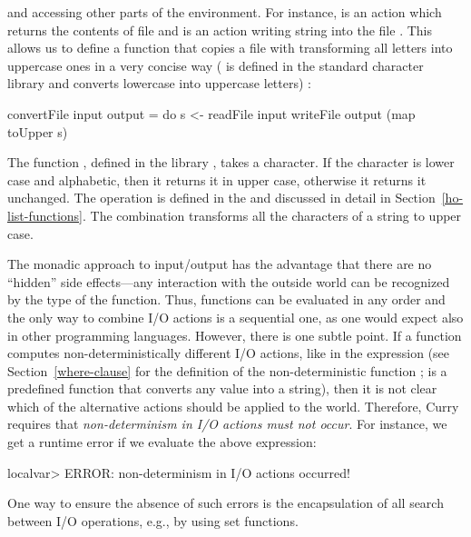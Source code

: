 and accessing other parts of the environment.
For instance, 
is an action which returns the contents
of file  and 
is an action writing string
 into the file . This allows us to define a function
that copies a file with transforming all letters into uppercase ones
in a very concise way (
is defined in the standard character library  and converts
lowercase into uppercase letters)
:
\begin{prog}
convertFile input output =
   do s <- readFile input
      writeFile output (map toUpper s)
\end{prog}
%
% 
The function , defined in the library ,
takes a character. If the character is lower case and alphabetic,
then it returns it in upper case, otherwise it returns it unchanged.
The operation  is defined in the 
and discussed in detail in Section~\ref{ho-list-functions}.
The combination  transforms all the characters
of a string to upper case.

The monadic approach to input/output has the advantage
that there are no ``hidden'' side effects---any interaction
with the outside world can be recognized by the  type of the
function. Thus, functions can be evaluated in any order
and the only way to combine I/O actions is a sequential one, as
one would expect also in other programming languages.
However, there is one subtle point. If a function computes
non-deterministically different I/O actions,
like in the expression 
(see Section~\ref{where-clause} for the definition
of the non-deterministic function ;
 is a predefined function that
converts any value into a string),
then it is not clear which of the alternative actions
should be applied to the world. Therefore, Curry requires
that \emph{non-determinism in I/O actions must not occur}.
For instance, we get a runtime error if we evaluate the
above expression:
\begin{prog}
localvar> 
ERROR: non-determinism in I/O actions occurred!
\end{prog}
%
One way to ensure the absence of such errors is the
encapsulation of all search between I/O operations, e.g.,
by using set functions.

